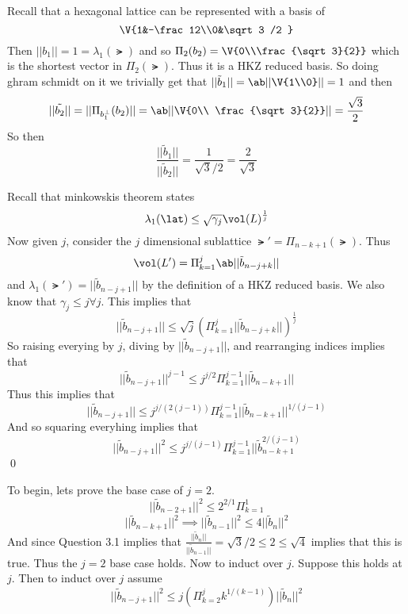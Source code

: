 \documentclass[12pt]{amsart}
\begin{document}
  \begin{problem}
    \begin{subproblem}
      Recall that a hexagonal lattice can be represented with a basis of 
      \[\V{1&-\frac12\\0&\sqrt3 /2 }\]
      Then $||b_1|| = 1 = \lambda_1(\lat)$ and so $\Pi_2(b_2) = \V{0\\\frac{\sqrt3}{2}}$ which is the shortest vector in $\Pi_2(\lat)$. Thus it is a HKZ reduced basis. So doing ghram schmidt on it we trivially get that 
      $||\tilde{b}_1|| = \ab||\V{1\\0}|| = 1$ and then 
      \[||\tilde{b_2}|| = ||\Pi_{b_1^\perp}(b_2)|| = \ab||\V{0\\ \frac{\sqrt3}{2}}|| = \frac{\sqrt3}{2}\]
      So then 
      \[\frac{||\tilde{b}_1||}{||\tilde{b}_2||} = \frac1{\sqrt3/2} = \frac2{\sqrt3}\]
    \end{subproblem}
    \begin{subproblem}
      Recall that minkowskis theorem states 
      \[\lambda_1(\lat) \leq \sqrt{\gamma_j}\vol(L)^{\frac1j}\]
      Now given $j$, consider the $j$ dimensional sublattice $\lat' = \Pi_{n-k+1}(\lat)$. Thus 
      \[\vol(L')=\Pi_{k=1}^j \ab||\tilde{b}_{n-j+k}||\]
      and $\lambda_1(\lat') = ||\tilde{b}_{n-j+1}||$ by the definition of a HKZ reduced basis. We also know that $\gamma_j\leq j\forall j$. This implies that 
      \[||\tilde{b}_{n-j+1}||\leq \sqrt{j}(\Pi_{k=1}^j||\tilde{b}_{n-j+k}||)^{\frac1j}\]
      So raising everying by $j$, diving by $||\tilde{b}_{n-j+1}||$, and rearranging indices implies that 
      \[||\tilde{b}_{n-j+1}||^{j-1}\leq j^{j/2} \Pi_{k=1}^{j-1} ||\tilde{b}_{n-k+1}||\]
      Thus this implies that 
      \[||\tilde{b}_{n-j+1}||\leq j^{j/(2(j-1))} \Pi_{k=1}^{j-1} ||\tilde{b}_{n-k+1}||^{1/(j-1)}\]
      And so squaring everyhing implies that 
      \[||\tilde{b}_{n-j+1}||^2\leq j^{j/(j-1)} \Pi_{k=1}^{j-1} ||\tilde{b}_{n-k+1}^{2/(j-1)}\]\qed
    \end{subproblem}
    \begin{subproblem}
      To begin, lets prove the base case of $j=2$.
      \[||\tilde{b}_{n-2+1}||^2 \leq 2^{2/1} \Pi_{k=1}^{1} \]
    \[||\tilde{b}_{n-k+1}||^2\implies ||\tilde{b}_{n-1}||^2 \leq 4 ||\tilde{b}_{n}||^2\]
      And since Question 3.1 implies that $\frac{||\tilde{b}_n||}{||\tilde{b}_{n-1}||} = \sqrt3/2 \leq 2 \leq \sqrt4$ implies that this is true. Thus the $j=2$ base case holds. Now to induct over $j$. Suppose this holds at $j$. Then to induct over $j$ assume
      \[||\tilde{b}_{n-j+1}||^2 \leq j (\Pi_{k=2}^j k^{1/(k-1)}) ||\tilde{b}_n||^2\]

\end{subproblem}
\end{problem}
\end{document}
